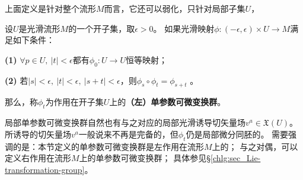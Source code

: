 上面定义是针对整个流形$M$而言，它还可以弱化，只针对局部子集$U$，
\begin{definition}\label{chdm:def_1PTG-local}
    设$U$是光滑流形$M$的一个开子集，取$\epsilon>0$。
    如果光滑映射$\phi:(-\epsilon,\epsilon)\times U \to M $满足如下条件：
    
    {\bfseries (1)} $\forall p\in U,\ |t|< \epsilon$都有$\phi_0 : U\to U$恒等映射；
    
    {\bfseries (2)} 若$|s|<\epsilon,\ |t|<\epsilon, \ |s+t|<\epsilon$，则$\phi_s\circ \phi_t = \phi_{s+t}$ 。
    
    那么，称$\phi_t$为作用在开子集$U$上的\textbf{（左）单参数可微变换群}。
\end{definition}
局部单参数可微变换群自然也有与之对应的局部光滑诱导切矢量场$v^a\in \mathfrak{X}(U)$。
所诱导的切矢量场$v^a$一般说来不再是完备的，但$\phi_t$仍是局部微分同胚的。
需要强调的是：本节定义的单参数可微变换群是{\kaishu 左作用}在流形$M$上的；
与之对偶，可以定义{\kaishu 右作用}在流形$M$上的单参数可微变换群；
具体参见\S\ref{chlg:sec_Lie-transformation-group}。


%
%


